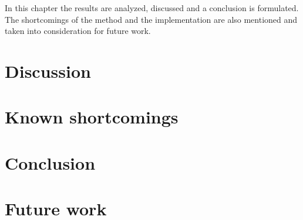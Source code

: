 In this chapter the results are analyzed, discussed and a conclusion is formulated. The shortcomings of the method and the implementation are also mentioned and taken into consideration for future work.

\section{Discussion}

\section{Known shortcomings}

\section{Conclusion}

\section{Future work}